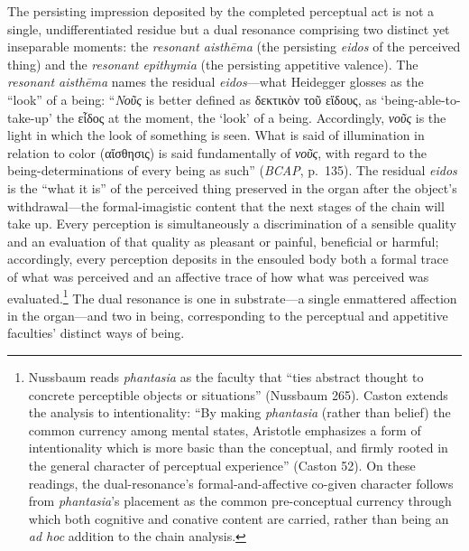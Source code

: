 \documentclass{article}
\newcommand{\gk}[1]{{\greekfont #1}}
\begin{document}
The persisting impression deposited by the completed perceptual act is not a single, undifferentiated residue but a dual resonance comprising two distinct yet inseparable moments: the \textit{resonant aisthēma} (the persisting \textit{eidos} of the perceived thing) and the \textit{resonant epithymia} (the persisting appetitive valence). The \textit{resonant aisthēma} names the residual \textit{eidos}---what Heidegger glosses as the ``look'' of a being: ``\textit{Νοῦς} is better defined as \gk{δεκτικὸν τοῦ εἴδους}, as `being-able-to-take-up' the \gk{εἶδος} at the moment, the `look' of a being. Accordingly, \textit{νοῦς} is the light in which the look of something is seen. What is said of illumination in relation to color (\gk{αἴσθησις}) is said fundamentally of \textit{νοῦς}, with regard to the being-determinations of every being as such'' (\textit{BCAP}, p.~135). The residual \textit{eidos} is the ``what it is'' of the perceived thing preserved in the organ after the object's withdrawal---the formal-imagistic content that the next stages of the chain will take up. Every perception is simultaneously a discrimination of a sensible quality and an evaluation of that quality as pleasant or painful, beneficial or harmful; accordingly, every perception deposits in the ensouled body both a formal trace of what was perceived and an affective trace of how what was perceived was evaluated.\footnote{Nussbaum reads \textit{phantasia} as the faculty that ``ties abstract thought to concrete perceptible objects or situations'' (Nussbaum 265). Caston extends the analysis to intentionality: ``By making \textit{phantasia} (rather than belief) the common currency among mental states, Aristotle emphasizes a form of intentionality which is more basic than the conceptual, and firmly rooted in the general character of perceptual experience'' (Caston 52). On these readings, the dual-resonance's formal-and-affective co-given character follows from \textit{phantasia}'s placement as the common pre-conceptual currency through which both cognitive and conative content are carried, rather than being an \textit{ad hoc} addition to the chain analysis.} The dual resonance is one in substrate---a single enmattered affection in the organ---and two in being, corresponding to the perceptual and appetitive faculties' distinct ways of being.
\end{document}
